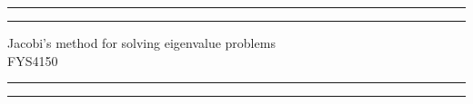 \documentclass[twoside,onecolumn]{article}
\date{\today} %
\begin{document}

\begin{titlepage} %

	\centering %
	
	\scshape %
	
	\vspace*{\baselineskip} %
	
	
	\rule{\textwidth}{1.6pt}\vspace*{-\baselineskip}\vspace*{2pt} %
	\rule{\textwidth}{0.4pt} %
	
	\vspace{0.75\baselineskip} %
	
	{\LARGE Jacobi's method for solving eigenvalue problems \\ %
	\bigskip
	FYS4150} %
	
	\vspace{0.75\baselineskip} %
	
	\rule{\textwidth}{0.4pt}\vspace*{-\baselineskip}\vspace{3.2pt} %
	\rule{\textwidth}{1.6pt} %
	
	\vspace{2\baselineskip} %
	
	
	
	\vspace*{3\baselineskip} %
	
	

\end{titlepage}
\end{document}
